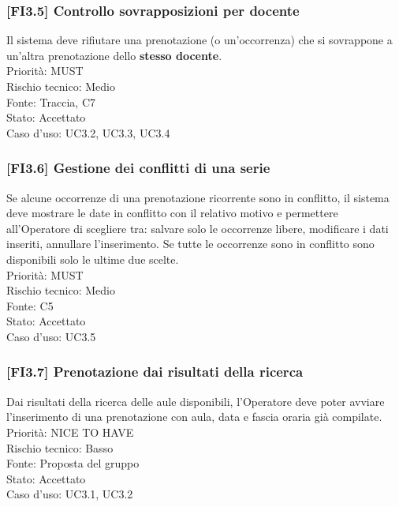 \subsubsection{[FI3.5] Controllo sovrapposizioni per docente}
Il sistema deve rifiutare una prenotazione (o un'occorrenza) che si sovrappone a un'altra prenotazione dello \textbf{stesso docente}.\\
Priorità: MUST\\Rischio tecnico: Medio\\Fonte: Traccia, C7\\Stato: Accettato\\Caso d'uso: UC3.2, UC3.3, UC3.4

\subsubsection{[FI3.6] Gestione dei conflitti di una serie}
Se alcune occorrenze di una prenotazione ricorrente sono in conflitto, il sistema deve mostrare le date in conflitto con il relativo motivo e permettere all'Operatore di scegliere tra: salvare solo le occorrenze libere, modificare i dati inseriti, annullare l'inserimento. Se tutte le occorrenze sono in conflitto sono disponibili solo le ultime due scelte.\\
Priorità: MUST\\Rischio tecnico: Medio\\Fonte: C5\\Stato: Accettato\\Caso d'uso: UC3.5

\subsubsection{[FI3.7] Prenotazione dai risultati della ricerca}
Dai risultati della ricerca delle aule disponibili, l'Operatore deve poter avviare l'inserimento di una prenotazione con aula, data e fascia oraria già compilate.\\
Priorità: NICE TO HAVE\\Rischio tecnico: Basso\\Fonte: Proposta del gruppo\\Stato: Accettato\\Caso d'uso: UC3.1, UC3.2
